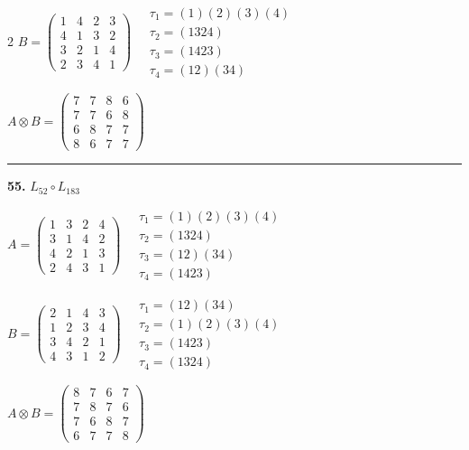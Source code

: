 \begin{multicols}{2}
$B = \begin{pmatrix} 1 & 4 & 2 & 3 \\ 4 & 1 & 3 & 2 \\ 3 & 2 & 1 & 4 \\ 2 & 3 & 4 & 1 \end{pmatrix} \quad \begin{matrix} \tau_{1}=(1)(2)(3)(4) \\ \tau_{2}=(1 3 2 4) \\ \tau_{3}=(1 4 2 3) \\ \tau_{4}=(1 2)(3 4) \end{matrix}$

$A \otimes B = \begin{pmatrix} 7 & 7 & 8 & 6 \\ 7 & 7 & 6 & 8 \\ 6 & 8 & 7 & 7 \\ 8 & 6 & 7 & 7 \end{pmatrix}$

\vspace{0.3em}
\hrule
\vspace{0.3em}

\noindent\textbf{55.} $L_{52} \circ L_{183}$

$A = \begin{pmatrix} 1 & 3 & 2 & 4 \\ 3 & 1 & 4 & 2 \\ 4 & 2 & 1 & 3 \\ 2 & 4 & 3 & 1 \end{pmatrix} \quad \begin{matrix} \tau_{1}=(1)(2)(3)(4) \\ \tau_{2}=(1 3 2 4) \\ \tau_{3}=(1 2)(3 4) \\ \tau_{4}=(1 4 2 3) \end{matrix}$

$B = \begin{pmatrix} 2 & 1 & 4 & 3 \\ 1 & 2 & 3 & 4 \\ 3 & 4 & 2 & 1 \\ 4 & 3 & 1 & 2 \end{pmatrix} \quad \begin{matrix} \tau_{1}=(1 2)(3 4) \\ \tau_{2}=(1)(2)(3)(4) \\ \tau_{3}=(1 4 2 3) \\ \tau_{4}=(1 3 2 4) \end{matrix}$

$A \otimes B = \begin{pmatrix} 8 & 7 & 6 & 7 \\ 7 & 8 & 7 & 6 \\ 7 & 6 & 8 & 7 \\ 6 & 7 & 7 & 8 \end{pmatrix}$


\end{multicols}
